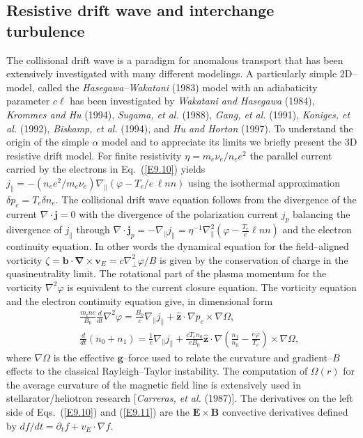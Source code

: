 \documentclass[a4paper,openany,12pt]{book}
\begin{document}
\subsection{Resistive drift wave and interchange turbulence}

The collisional drift wave is a paradigm for anomalous transport that has been extensively investigated with many different modelings. A particularly simple 2D--model, called the \emph{Hasegawa--Wakatani} (1983) model with an adiabaticity parameter $c\ell$ has been investigated by \emph{Wakatani and Hasegawa} (1984), \emph{Krommes and Hu} (1994), \emph{Sugama, et al.} (1988), \emph{Gang, et al.} (1991), \emph{Koniges, et al.} (1992), \emph{Biskamp, et al.} (1994), and \emph{Hu and Horton} (1997). To understand the origin of the simple $\alpha$ model and to appreciate its limits we briefly present the 3D resistive drift model. For finite resistivity $\eta=m_e\nu_e/n_e e^2$ the parallel current carried by the electrons in Eq.~(\ref{E9.10}) yields 
$j_\|=-(n_e e^2/m_e\nu_e)\nabla_\|(\varphi-T_e/e\,\ell nn)$ using the isothermal approximation 
$\delta p_e=T_e\delta n_e$. The collisional drift wave equation follows from the divergence of the current $\nabla\cdot\bm{ j}=0$ with the divergence of the polarization current $j_p$ balancing the divergence of $j_\|$ through $\nabla\cdot\bm{j}_p=-\nabla_\| j_\|=\eta^{-1}\nabla_\|^2(\varphi-\frac{T_e}{e}\ell nn)$ and the electron continuity equation. In other words the dynamical equation for the field--aligned vorticity $\zeta=\bm{b\cdot\nabla\times v}_E=c\nabla_\perp^2\varphi/B$ is given by the conservation of charge in the quasineutrality limit. The rotational part of the plasma momentum for the vorticity $\nabla^2\varphi$ is equivalent to the current closure equation. The vorticity equation and the electron continuity equation give, in dimensional form
\begin{eqnarray}
&&\frac{m_i nc}{B_0}\frac{d}{dt}\nabla^2\varphi=\frac{B_0}{c}\nabla_\| j_\|+\widehat{\bm{z}}\cdot\nabla p_e\times\nabla\Omega,\label{E9.10}\\
&&\frac{d}{dt}(n_0+n_1)=\frac{1}{e}\nabla_\| j_\|+\frac{cT_en_0}{eB_0}\widehat{\bm{z}}\cdot\nabla\left(\frac{n_1}{n_0}-\frac{e\varphi}{T_e}\right)\times\nabla\Omega,\label{E9.11}
\end{eqnarray}
%
where $\nabla\Omega$ is the effective $\bm{g}$--force used to relate the curvature and gradient--$B$ effects to the classical Rayleigh--Taylor instability. The computation of $\Omega(r)$ for the average curvature of the magnetic field line is extensively used in stellarator/heliotron research [\emph{Carreras, et al.} (1987)]. The derivatives on the left side of Eqs.~(\ref{E9.10}) and (\ref{E9.11}) are the $\bm{E\times B}$ convective derivatives defined by $df/dt = \partial_t f+v_E\cdot\nabla f$.
\end{document}
